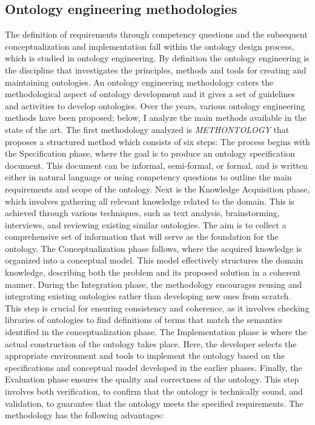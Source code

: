 \subsection{Ontology engineering methodologies}
The definition of requirements through competency questions and the subsequent conceptualization and implementation fall within the ontology design process, which is studied in ontology engineering. By definition the ontology engineering  is the discipline that investigates the principles, methods and tools for creating and maintaining ontologies. An ontology engineering methodology caters the methodological aspect of ontology development and it gives a set of guidelines and activities to develop ontologies.\cite{iqbal2013analysis}
Over the years, various ontology engineering methods have been proposed; below, I analyze the main methods available in the state of the art.
The first methodology analyzed is \textit{METHONTOLOGY} \cite{fernandez1997ontological} that proposes a structured method which consists of six steps: 
The process begins with the Specification phase, where the goal is to produce an ontology specification document. This document can be informal, semi-formal, or formal, and is written either in natural language or using competency questions to outline the main requirements and scope of the ontology. Next is the Knowledge Acquisition phase, which involves gathering all relevant knowledge related to the domain. This is achieved through various techniques, such as text analysis, brainstorming, interviews, and reviewing existing similar ontologies. The aim is to collect a comprehensive set of information that will serve as the foundation for the ontology. The Conceptualization phase follows, where the acquired knowledge is organized into a conceptual model. This model effectively structures the domain knowledge, describing both the problem and its proposed solution in a coherent manner. During the Integration phase, the methodology encourages reusing and integrating existing ontologies rather than developing new ones from scratch. This step is crucial for ensuring consistency and coherence, as it involves checking libraries of ontologies to find definitions of terms that match the semantics identified in the conceptualization phase. The Implementation phase is where the actual construction of the ontology takes place. Here, the developer selects the appropriate environment and tools to implement the ontology based on the specifications and conceptual model developed in the earlier phases. Finally, the Evaluation phase ensures the quality and correctness of the ontology. This step involves both verification, to confirm that the ontology is technically sound, and validation, to guarantee that the ontology meets the specified requirements. The methodology has the following advantages: 
